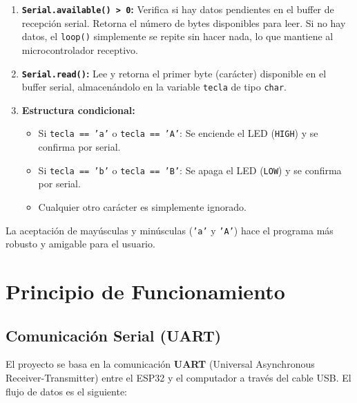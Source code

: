 \documentclass[12pt,a4paper]{article}
\begin{document}
\begin{enumerate}
    \item \textbf{\texttt{Serial.available() > 0}:} Verifica si hay datos pendientes en el buffer de recepción serial. Retorna el número de bytes disponibles para leer. Si no hay datos, el \texttt{loop()} simplemente se repite sin hacer nada, lo que mantiene al microcontrolador receptivo.
    
    \item \textbf{\texttt{Serial.read()}:} Lee y retorna el primer byte (carácter) disponible en el buffer serial, almacenándolo en la variable \texttt{tecla} de tipo \texttt{char}.
    
    \item \textbf{Estructura condicional:}
    \begin{itemize}
        \item Si \texttt{tecla == 'a'} o \texttt{tecla == 'A'}: Se enciende el LED (\texttt{HIGH}) y se confirma por serial.
        \item Si \texttt{tecla == 'b'} o \texttt{tecla == 'B'}: Se apaga el LED (\texttt{LOW}) y se confirma por serial.
        \item Cualquier otro carácter es simplemente ignorado.
    \end{itemize}
\end{enumerate}

La aceptación de mayúsculas y minúsculas (\texttt{'a'} y \texttt{'A'}) hace el programa más robusto y amigable para el usuario.

\section{Principio de Funcionamiento}

\subsection{Comunicación Serial (UART)}
El proyecto se basa en la comunicación \textbf{UART} (Universal Asynchronous Receiver-Transmitter) entre el ESP32 y el computador a través del cable USB. El flujo de datos es el siguiente:
\end{document}
